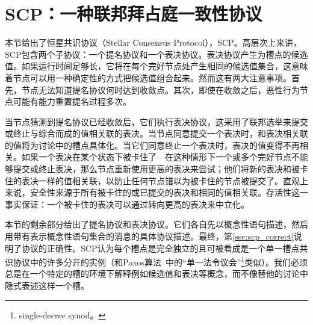 \section{SCP：一种联邦拜占庭一致性协议}\label{sec:scp}

本节给出了恒星共识协议（Stellar Consensus Protocol），SCP。高层次上来讲，SCP包含两个子协议：一个提名协议和一个表决协议。表决协议产生为槽点的候选值。如果运行时间足够长，它将在每个完好节点处产生相同的候选值集合，这意味着节点可以用一种确定性的方式把候选值组合起来。然而这有两大注意事项。首先，节点无法知道提名协议何时达到收敛点。其次，即使在收敛之后，恶性行为节点可能有能力重置提名过程多次。

当节点猜测到提名协议已经收敛后，它们执行表决协议，这采用了联邦选举来提交或终止与综合而成的值相关联的表决。当节点同意提交一个表决时，和表决相关联的值将为讨论中的槽点具体化。当它们同意终止一个表决时，表决的值变得不再相关。如果一个表决在某个状态下被卡住了---在这种情形下一个或多个完好节点不能够提交或终止表决，那么节点重新使用更高的表决来尝试；他们将新的表决和被卡住的表决一样的值相关联，以防止任何节点错以为被卡住的节点被提交了。直观上来说，安全性来源于所有被卡住的或已提交的表决和相同的值相关联。存活性这一事实保证：一个被卡住的表决可以通过转向更高的表决来中立化。

本节的剩余部分给出了提名协议和表决协议。它们各自先以概念性语句描述，然后用带有表示概念性语句集合的消息的具体协议描述。最终，第\ref{sec:scp_correct}说明了协议的正确性。SCP认为每个槽点是完全独立的且可被看成是一个单一槽点共识协议中的许多分开的实例（和Paxos算法~\cite{Lamport:1998:PP:279227.279229}中的``单一法令议会''\footnote{single-decree synod。}类似）。我们必须总是在一个特定的槽的环境下解释例如候选值和表决等概念，而不像替他的讨论中隐式表述这样一个槽。



